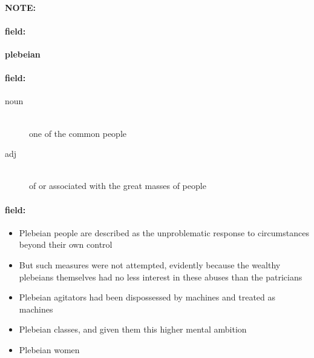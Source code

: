 \documentclass[12pt]{article}
\newenvironment{note}{\paragraph{NOTE:}}{}
\newenvironment{field}{\paragraph{field:}}{}
\begin{document}
\begin{note}
\begin{field}
\textbf{\large plebeian}
\end{field}


\begin{field}
\begin{description}
\item[noun] \hfill \\ 
one of the common people

\item[adj] \hfill \\ 
of or associated with the great masses of people

\end{description}
\end{field}

\begin{field}
\begin{itemize}
\item Plebeian people are described as the unproblematic response to circumstances beyond their own control
\item But such measures were not attempted, evidently because the wealthy plebeians themselves had no less interest in these abuses than the patricians
\item Plebeian agitators had been dispossessed by machines and treated as machines
\item Plebeian classes, and given them this higher mental ambition
\item Plebeian women
\end{itemize}
\end{field}
\end{note}
\end{document}
